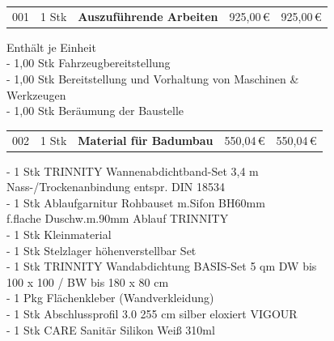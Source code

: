 \documentclass[a4paper,11pt]{article}
\begin{document}
\vspace{0.3cm}

\noindent
\begin{tabularx}{\textwidth}{@{}P{0.8cm}P{1.2cm}X R{2.3cm}R{2.3cm}@{}}
    001 & 1 Stk & \textbf{Auszuführende Arbeiten} & 925,00\,\euro & 925,00\,\euro\\
\end{tabularx}

\vspace{0.2cm}
\hspace{2cm}
\begin{minipage}{0.8\textwidth}
    \small
    Enthält je Einheit\\[0.2em]
    - 1,00 Stk Fahrzeugbereitstellung\\
    - 1,00 Stk Bereitstellung und Vorhaltung von Maschinen \&\\
    \hspace{0.5cm}Werkzeugen\\
    - 1,00 Stk Beräumung der Baustelle
\end{minipage}

\vspace{0.5cm}

\noindent
\begin{tabularx}{\textwidth}{@{}P{0.8cm}P{1.2cm}X R{2.3cm}R{2.3cm}@{}}
    002 & 1 Stk & \textbf{Material für Badumbau} & 550,04\,\euro & 550,04\,\euro\\
\end{tabularx}

\vspace{0.2cm}
\hspace{2cm}
\begin{minipage}{0.8\textwidth}
    \small
    - 1 Stk TRINNITY Wannenabdichtband-Set 3,4 m\\
    \hspace{0.5cm}Nass-/Trockenanbindung entspr. DIN 18534\\
    - 1 Stk Ablaufgarnitur Rohbauset m.Sifon BH60mm\\
    \hspace{0.5cm}f.flache Duschw.m.90mm Ablauf TRINNITY\\
    - 1 Stk Kleinmaterial\\
    - 1 Stk Stelzlager höhenverstellbar Set\\
    - 1 Stk TRINNITY Wandabdichtung BASIS-Set 5 qm DW bis\\
    \hspace{0.5cm}100 x 100 / BW bis 180 x 80 cm\\
    - 1 Pkg Flächenkleber (Wandverkleidung)\\
    - 1 Stk Abschlussprofil 3.0 255 cm silber eloxiert VIGOUR\\
    - 1 Stk CARE Sanitär Silikon Weiß 310ml
\end{minipage}
\end{document}
